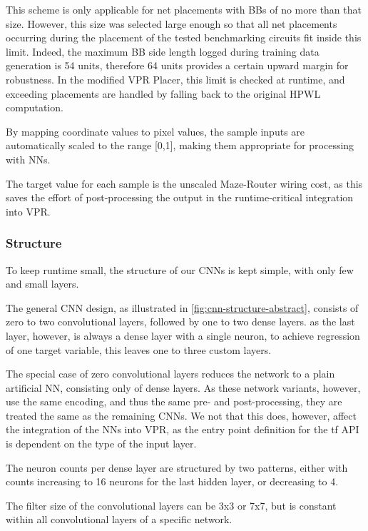 This scheme is only applicable for net placements with \glspl{BB} of no more than that size. However, this size was selected large enough so that all net placements occurring during the placement of the tested benchmarking circuits fit inside this limit. Indeed, the maximum \gls{BB} side length logged during training data generation is 54 units, therefore 64 units provides a certain upward margin for robustness. In the modified \gls{VPR} Placer, this limit is checked at runtime, and exceeding placements are handled by falling back to the original \gls{HPWL} computation.

By mapping coordinate values to pixel values, the sample inputs are automatically scaled to the range [0,1], making them appropriate for processing with \glspl{NN}.

The target value for each sample is the unscaled Maze-Router wiring cost, as this saves the effort of post-processing the output in the runtime-critical integration into \gls{VPR}.\cite{TODO}

\subsubsection{Structure}\label{ch:cnn-design}

To keep runtime small, the structure of our \glspl{CNN} is kept simple, with only few and small layers.

The general \gls{CNN} design, as illustrated in \ref{fig:cnn-structure-abstract}, consists of zero to two convolutional layers, followed by one to two dense layers. as the last layer, however, is always a dense layer with a single neuron, to achieve regression of one target variable, this leaves one to three custom layers. 

The special case of zero convolutional layers reduces the network to a plain artificial \gls{NN}, consisting only of dense layers. As these network variants, however, use the same encoding, and thus the same pre- and post-processing, they are treated the same as the remaining \glspl{CNN}. We not that this does, however, affect the integration of the \glspl{NN} into \gls{VPR}, as the entry point definition for the \gls{tf} API is dependent on the type of the input layer.

The neuron counts per dense layer are structured by two patterns, either with counts increasing to 16 neurons for the last hidden layer, or decreasing to 4.

The filter size of the convolutional layers can be 3x3 or 7x7, but is constant within all convolutional layers of a specific network.

